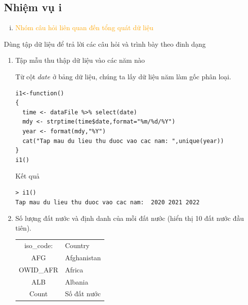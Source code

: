 \documentclass[a4paper]{article}
\theoremstyle{definition}
\begin{document}
\subsection{Nhiệm vụ i}
\begin{enumerate}[i)]
\item \textcolor{orange}{Nhóm câu hỏi liên quan đến tổng quát dữ liệu}
\end{enumerate}

Dùng tập dữ liệu để trả lời các câu hỏi và trình bày theo đinh dạng

\begin{enumerate}[1)]
\item Tập mẫu thu thập dữ liệu vào các năm nào 

Từ cột $date$ ở bảng dữ liệu, chúng ta lấy dữ liệu năm làm gốc phân loại.
\begin{lstlisting}
i1<-function()
{
  time <- dataFile %>% select(date)
  mdy <- strptime(time$date,format="%m/%d/%Y")
  year <- format(mdy,"%Y")
  cat("Tap mau du lieu thu duoc vao cac nam: ",unique(year))
}
i1()
\end{lstlisting}
Kết quả
\begin{lstlisting}
> i1()
Tap mau du lieu thu duoc vao cac nam:  2020 2021 2022
\end{lstlisting}

\item Số lượng đất nước và định danh của mỗi đất nước (hiển thị 10 đất nước đầu tiên).
    \begin{center}
      \begin{tabular}{ c l }
        iso\_code: & Country \\ 
        AFG & Afghanistan  \\ 
        OWID\_AFR & Africa \\
        ALB & Albania\\ 
        Count & Số đất nước
      \end{tabular}
    \end{center}


\end{enumerate}
\end{document}
